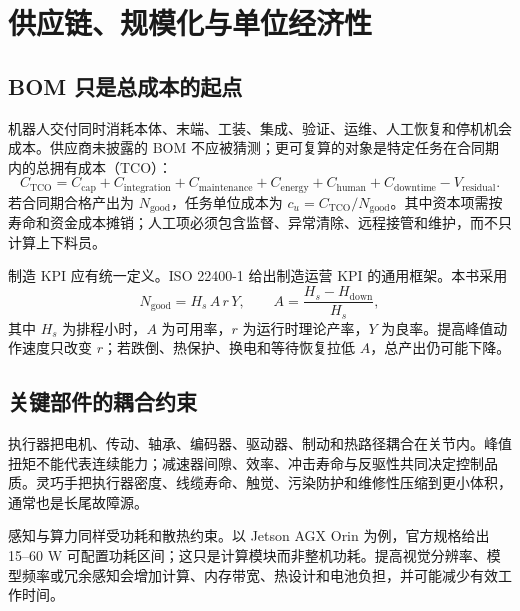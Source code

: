 \chapter{供应链、规模化与单位经济性}
\label{chap:supply-chain-unit-economics}

\section{BOM 只是总成本的起点}

机器人交付同时消耗本体、末端、工装、集成、验证、运维、人工恢复和停机机会成本。供应商未披露的 BOM 不应被猜测；更可复算的对象是特定任务在合同期内的总拥有成本（TCO）：
\begin{equation}
C_{\mathrm{TCO}}=C_{\mathrm{cap}}+C_{\mathrm{integration}}+C_{\mathrm{maintenance}}+C_{\mathrm{energy}}+C_{\mathrm{human}}+C_{\mathrm{downtime}}-V_{\mathrm{residual}}.
\label{eq:robot-tco}
\end{equation}
若合同期合格产出为 $N_{\mathrm{good}}$，任务单位成本为 $c_u=C_{\mathrm{TCO}}/N_{\mathrm{good}}$。其中资本项需按寿命和资金成本摊销；人工项必须包含监督、异常清除、远程接管和维护，而不只计算上下料员。

制造 KPI 应有统一定义。ISO 22400-1 给出制造运营 KPI 的通用框架\cite{iso22400_1_2014}。本书采用
\begin{equation}
N_{\mathrm{good}}=H_s\,A\,r\,Y,
\qquad A=\frac{H_s-H_{\mathrm{down}}}{H_s},
\label{eq:effective-output}
\end{equation}
其中 $H_s$ 为排程小时，$A$ 为可用率，$r$ 为运行时理论产率，$Y$ 为良率。提高峰值动作速度只改变 $r$；若跌倒、热保护、换电和等待恢复拉低 $A$，总产出仍可能下降。

\section{关键部件的耦合约束}

执行器把电机、传动、轴承、编码器、驱动器、制动和热路径耦合在关节内。峰值扭矩不能代表连续能力；减速器间隙、效率、冲击寿命与反驱性共同决定控制品质。灵巧手把执行器密度、线缆寿命、触觉、污染防护和维修性压缩到更小体积，通常也是长尾故障源。

感知与算力同样受功耗和散热约束。以 Jetson AGX Orin 为例，官方规格给出 15--60 W 可配置功耗区间\cite{nvidia2026orin}；这只是计算模块而非整机功耗。提高视觉分辨率、模型频率或冗余感知会增加计算、内存带宽、热设计和电池负担，并可能减少有效工作时间。

